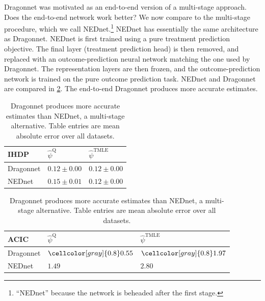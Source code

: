 \documentclass{article}
\newcommand{\maxf}[1]{{\cellcolor[gray]{0.8}}#1}
\begin{document}
Dragonnet was motivated as an end-to-end version of a multi-stage approach.
Does the end-to-end network work better?
We now compare to the multi-stage procedure, which we call NEDnet.\footnote{``NEDnet'' because the network is beheaded after the first stage.}
NEDnet has essentially the same architecture as Dragonnet. 
NEDnet is first trained using a pure treatment prediction objective.
The final layer (treatment prediction head) is then removed, and replaced with an outcome-prediction neural network matching the one used by Dragonnet.
The representation layers are then frozen, and the outcome-prediction network is trained on the pure outcome prediction task. 
NEDnet and Dragonnet are compared in \cref{tb:ned_comparison}. The end-to-end Dragonnet produces more accurate estimates.
\begin{table}[htb] 
 \captionsetup{width=0.9\linewidth}
\caption{Dragonnet produces more accurate estimates than NEDnet, a multi-stage alternative. Table entries are mean absolute error over all datasets. \label{tb:ned_comparison} }
\begin{minipage}{.45\textwidth}
\centering

  \vspace{1em}
 \begin{tabular}{lll}

    IHDP    &  $\hat{\psi}^{\mathrm{Q}}$  & $\hat{\psi}^{\mathrm{TMLE}}$  \\
\midrule
   Dragonnet &  \maxf{$0.12\pm0.00$} & \maxf{$0.12\pm0.00$}\\
   NEDnet &  $0.15\pm0.01$ & \maxf{$0.12\pm0.00$} \\
    \bottomrule
\end{tabular}
\end{minipage}
\qquad
\hspace{1.5em}
\begin{minipage}{.45\textwidth}

  \vspace{1em}
\begin{tabular}{lll}

    ACIC    &  $\hat{\psi}^{\mathrm{Q}}$  & $\hat{\psi}^{\mathrm{TMLE}}$  \\
\midrule
   Dragonnet &  $\maxf{0.55}$ & $\maxf{1.97}$\\
   NEDnet & $1.49$& $2.80$ \\
    \bottomrule
\end{tabular}
\end{minipage}
\end{table}
\end{document}
